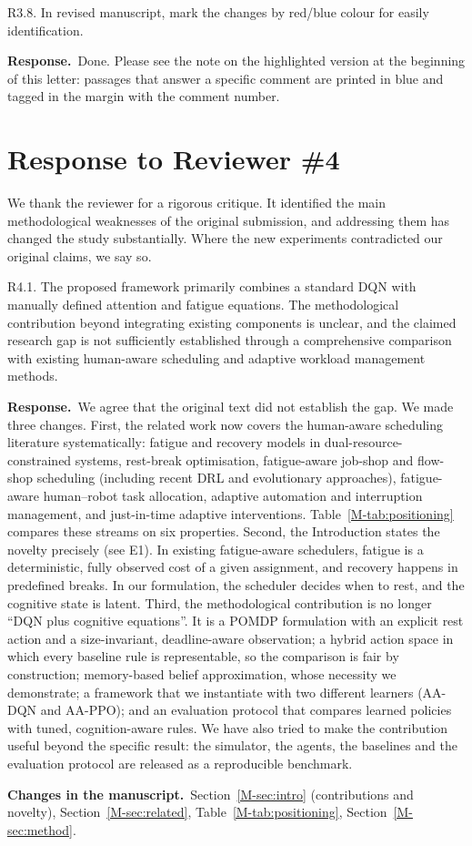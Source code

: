 \documentclass[11pt]{article}
\newcommand{\resp}{\par\smallskip\noindent\textbf{Response.}~}
\newcommand{\change}{\par\smallskip\noindent\textbf{Changes in the manuscript.}~}
\newcommand{\Sec}[1]{Section~\ref{M-#1}}
\newcommand{\Tab}[1]{Table~\ref{M-#1}}
\begin{document}
\begin{rcomment}{R3.8.}
In revised manuscript, mark the changes by red/blue colour for easily identification.
\end{rcomment}
\resp Done. Please see the note on the highlighted version at the beginning of this letter: passages that answer a specific comment are printed in blue and tagged in the margin with the comment number.

\section*{Response to Reviewer \#4}
We thank the reviewer for a rigorous critique. It identified the main methodological weaknesses of the original submission, and addressing them has changed the study substantially. Where the new experiments contradicted our original claims, we say so.

\begin{rcomment}{R4.1.}
The proposed framework primarily combines a standard DQN with manually defined attention and fatigue equations. The methodological contribution beyond integrating existing components is unclear, and the claimed research gap is not sufficiently established through a comprehensive comparison with existing human-aware scheduling and adaptive workload management methods.
\end{rcomment}
\resp We agree that the original text did not establish the gap. We made three changes. First, the related work now covers the human-aware scheduling literature systematically: fatigue and recovery models in dual-resource-constrained systems, rest-break optimisation, fatigue-aware job-shop and flow-shop scheduling (including recent DRL and evolutionary approaches), fatigue-aware human--robot task allocation, adaptive automation and interruption management, and just-in-time adaptive interventions. \Tab{tab:positioning} compares these streams on six properties. Second, the Introduction states the novelty precisely (see E1). In existing fatigue-aware schedulers, fatigue is a deterministic, fully observed cost of a given assignment, and recovery happens in predefined breaks. In our formulation, the scheduler decides when to rest, and the cognitive state is latent. Third, the methodological contribution is no longer ``DQN plus cognitive equations''. It is a POMDP formulation with an explicit rest action and a size-invariant, deadline-aware observation; a hybrid action space in which every baseline rule is representable, so the comparison is fair by construction; memory-based belief approximation, whose necessity we demonstrate; a framework that we instantiate with two different learners (AA-DQN and AA-PPO); and an evaluation protocol that compares learned policies with tuned, cognition-aware rules. We have also tried to make the contribution useful beyond the specific result: the simulator, the agents, the baselines and the evaluation protocol are released as a reproducible benchmark.
\change \Sec{sec:intro} (contributions and novelty), \Sec{sec:related}, \Tab{tab:positioning}, \Sec{sec:method}.
\end{document}
